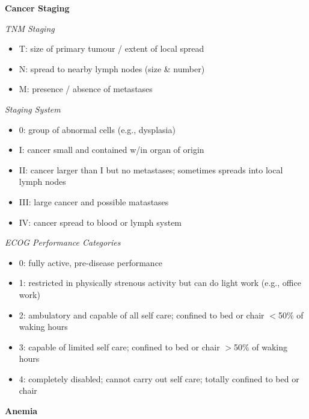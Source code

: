 \documentclass[twocolumn]{article}
\begin{document}
\vspace{-.5em}
\dotfill

\textbf{Cancer Staging}

\textit{TNM Staging}
\vspace{-.5em}
\begin{itemize}
    \item T: size of primary tumour / extent of local spread
    \item N: spread to nearby lymph nodes (size \& number)
    \item M: presence / absence of metastases
\end{itemize} \vspace{-.5em}

\textit{Staging System}
\vspace{-.5em}
\begin{itemize}
    \item 0: group of abnormal cells (e.g., dysplasia)
    \item I: cancer small and contained w/in organ of origin
    \item II: cancer larger than I but no metastases; sometimes spreads into local lymph nodes
    \item III: large cancer and possible matastases
    \item IV: cancer spread to blood or lymph system
\end{itemize} \vspace{-.5em}

\textit{ECOG Performance Categories}
\vspace{-.5em}
\begin{itemize}
    \item 0: fully active, pre-disease performance
    \item 1: restricted in physically strenous activity but can do light work (e.g., office work)
    \item 2: ambulatory and capable of all self care; confined to bed or chair $<$50\% of waking hours
    \item 3: capable of limited self care; confined to bed or chair $>$50\% of waking hours
    \item 4: completely disabled; cannot carry out self care; totally confined to bed or chair
\end{itemize}


\newpage


\textbf{Anemia}
\end{document}
